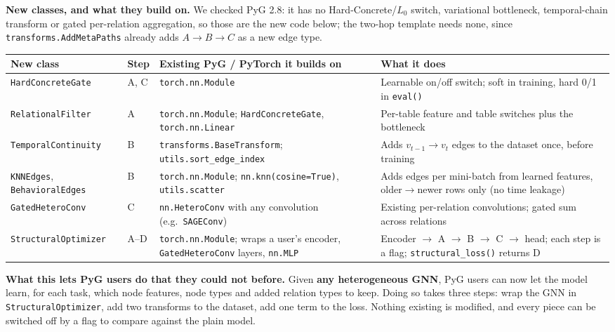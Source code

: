 \documentclass{article}
\newcommand{\code}[1]{\texttt{#1}}
\begin{document}
\textbf{New classes, and what they build on.} We checked PyG 2.8: it has no Hard-Concrete/$L_0$ switch, variational bottleneck, temporal-chain transform or gated per-relation aggregation, so those are the new code below; the two-hop template needs none, since \code{transforms.AddMetaPaths} already adds $A\to B\to C$ as a new edge type.
\\
\begin{center}
\vspace{-1.1em}
\scriptsize
\setlength{\tabcolsep}{4pt}
\renewcommand{\arraystretch}{1.0}
\begin{tabular}{@{}>{\raggedright\arraybackslash}p{2.9cm}>{\raggedright\arraybackslash}p{0.7cm}>{\raggedright\arraybackslash}p{4.6cm}>{\raggedright\arraybackslash}p{4.9cm}@{}}
\toprule
\textbf{New class} & \textbf{Step} & \textbf{Existing PyG / PyTorch it builds on} & \textbf{What it does} \\
\midrule
\code{HardConcreteGate} & A, C & \code{torch.nn.Module} & Learnable on/off switch; soft in training, hard 0/1 in \code{eval()} \\
\code{RelationalFilter} & A & \code{torch.nn.Module}; \code{HardConcreteGate}, \code{torch.nn.Linear} & Per-table feature and table switches plus the bottleneck \\
\code{TemporalContinuity} & B & \code{transforms.BaseTransform}; \code{utils.sort\_edge\_index} & Adds $v_{t-1}\to v_t$ edges to the dataset once, before training \\
\code{KNNEdges}, \code{BehavioralEdges} & B & \code{torch.nn.Module}; \code{nn.knn(cosine=True)}, \code{utils.scatter} & Adds edges per mini-batch from learned features, older$\to$newer rows only (no time leakage) \\
\code{GatedHeteroConv} & C & \code{nn.HeteroConv} with any convolution (e.g.\ \code{SAGEConv}) & Existing per-relation convolutions; gated sum across relations \\
\code{StructuralOptimizer} & A--D & \code{torch.nn.Module}; wraps a user's encoder, \code{GatedHeteroConv} layers, \code{nn.MLP} & Encoder $\to$ A $\to$ B $\to$ C $\to$ head; each step is a flag; \code{structural\_loss()} returns D \\
\bottomrule
\end{tabular}
\vspace{-0.5em}
\end{center}

\textbf{What this lets PyG users do that they could not before.} Given \textbf{any heterogeneous GNN}, PyG users can now let the model learn, for each task, which node features, node types and added relation types to keep. Doing so takes three steps: wrap the GNN in \code{StructuralOptimizer}, add two transforms to the dataset, add one term to the loss. Nothing existing is modified, and every piece can be switched off by a flag to compare against the plain model.
\end{document}
